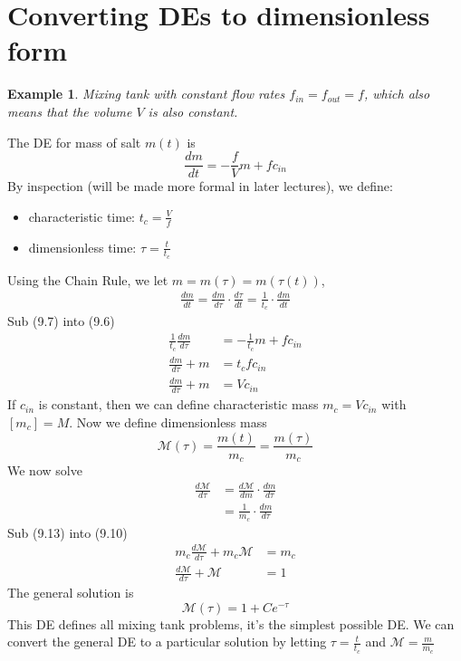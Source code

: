 \documentclass{report}
\newtheorem{ex}{Example}[section]
\begin{document}
\section{Converting DEs to dimensionless form}
\begin{ex}
Mixing tank with constant flow rates $f_{in} = f_{out} = f$, which also means that the volume $V$ is also constant.
\end{ex}
\noindent
The DE for mass of salt $m(t)$ is
\begin{equation}
\frac{dm}{dt} = -\frac{f}{V}m + fc_{in}
\end{equation}
By inspection (will be made more formal in later lectures), we define:
\begin{itemize}
\item characteristic time: $t_c = \frac{V}{f}$
\item dimensionless time: $\tau = \frac{t}{t_c}$
\end{itemize}
Using the Chain Rule, we let $m = m(\tau) = m(\tau(t))$,
\begin{align}
\frac{dm}{dt} = \frac{dm}{d\tau}\cdot\frac{d\tau}{dt} = \frac{1}{t_c}\cdot \frac{dm}{dt}
\end{align}
Sub (9.7) into (9.6)
\begin{align}
\frac{1}{t_c}\frac{dm}{d\tau} &= -\frac{1}{t_c}m + fc_{in} \\
\frac{dm}{d\tau} + m &= t_cfc_{in} \\
\frac{dm}{d\tau} + m &= Vc_{in}
\end{align}
If $c_{in}$ is constant, then we can define characteristic mass $m_c = Vc_{in}$ with $[m_c] = M$. Now we define dimensionless mass
\begin{equation}
\mathcal{M}(\tau) = \frac{m(t)}{m_c} = \frac{m(\tau)}{m_c}
\end{equation}
We now solve
\begin{align}
\frac{d\mathcal{M}}{d\tau} &= \frac{d\mathcal{M}}{dm}\cdot \frac{dm}{d\tau} \\
&= \frac{1}{m_c}\cdot \frac{dm}{d\tau}
\end{align}
Sub (9.13) into (9.10)
\begin{align}
m_c\frac{d\mathcal{M}}{d\tau} + m_c\mathcal{M} &= m_c \\
\frac{d\mathcal{M}}{d\tau} + \mathcal{M} &= 1
\end{align}
The general solution is
$$\mathcal{M}(\tau) = 1 + Ce^{-\tau}$$
This DE defines all mixing tank problems, it's the simplest possible DE. We can convert the general DE to a particular solution by letting $\tau = \frac{t}{t_c}$ and $\mathcal{M} = \frac{m}{m_c}$
\end{document}
